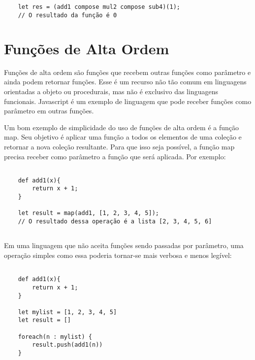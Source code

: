 \begin{lstlisting}[caption={Exemplo de Composição de Funções},label=fogex]


    let res = (add1 compose mul2 compose sub4)(1);
    // O resultado da função é 0

\end{lstlisting}


\section{Funções de Alta Ordem}

Funções de alta ordem são funções que recebem 
outras funções como parâmetro e ainda podem 
retornar funções\cite{realworldhaskell, functionalscala}. Esse é um recurso 
não tão comum em linguagens orientadas a 
objeto ou procedurais, mas não é exclusivo das 
linguagens funcionais. Javascript é um 
exemplo de linguagem que pode receber funções 
como parâmetro em outras funções\cite{eloquentjs}.

Um bom exemplo de simplicidade do uso de 
funções de alta ordem é a função map\cite{hofscala}. Seu objetivo 
é aplicar uma função a todos os elementos de uma 
coleção e retornar a nova coleção resultante. 
Para que isso seja possível, a função map precisa 
receber como parâmetro a função que será aplicada. 
Por exemplo:

\begin{lstlisting}[caption={Exemplo de Função de Alta Ordem},label=hof]

    def add1(x){
        return x + 1;
    }

    let result = map(add1, [1, 2, 3, 4, 5]);
    // O resultado dessa operação é a lista [2, 3, 4, 5, 6]
        

\end{lstlisting}

Em uma linguagem que não aceita funções sendo 
passadas por parâmetro, uma operação simples como 
essa poderia tornar-se mais verbosa e menos legível:

\begin{lstlisting}[caption={Exemplo sem Funções de Alta Ordem},label=nohof]

    def add1(x){
        return x + 1;
    }

    let mylist = [1, 2, 3, 4, 5]
    let result = []

    foreach(n : mylist) {
        result.push(add1(n))
    }

\end{lstlisting}


